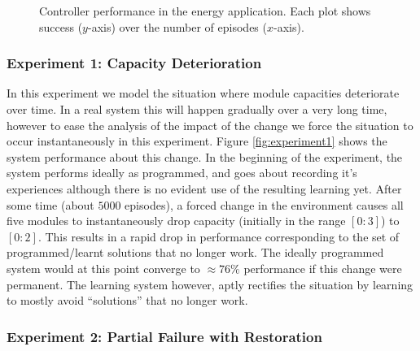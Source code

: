  \begin{figure*}[t]
 \begin{center}
 \qquad
 \qquad
 \caption{Controller performance in the energy application. Each plot shows success ($y$-axis) over the number of episodes ($x$-axis).}
 \end{center}
 \label{fig:energystorage}
 \end{figure*}


\subsubsection{Experiment 1: Capacity Deterioration}

In this experiment we model the situation where module capacities deteriorate over time. In a real system this will happen gradually over a very long time, however to ease the analysis of the impact of the change we force the situation to occur instantaneously in this experiment. Figure \ref{fig:experiment1} shows the system performance about this change. In the beginning of the experiment, the system performs ideally as programmed, and goes about recording it's experiences although there is no evident use of the resulting learning yet. After some time (about $5000$ episodes), a forced change in the environment causes all five modules to instantaneously drop capacity (initially in the range $[0:3]$) to $[0:2]$. This results in a rapid drop in performance corresponding to the set of programmed/learnt solutions that no longer work. The ideally programmed system would at this point converge to $\approx 76\%$ performance if this change were permanent. The learning system however, aptly rectifies the situation by learning to mostly avoid ``solutions'' that no longer work. 


%

\subsubsection{Experiment 2: Partial Failure with Restoration}

